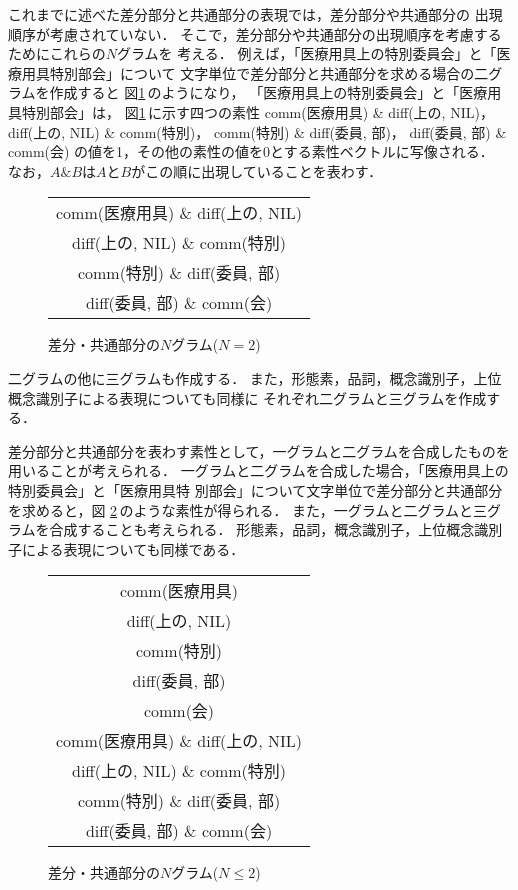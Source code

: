 これまでに述べた差分部分と共通部分の表現では，差分部分や共通部分の
出現順序が考慮されていない．
そこで，差分部分や共通部分の出現順序を考慮するためにこれらの$N$グラムを
考える．
例えば，「医療用具上の特別委員会」と「医療用具特別部会」について
文字単位で差分部分と共通部分を求める場合の二グラムを作成すると
図\ref{fig:mdiff_char_bigram}\,のようになり，
「医療用具上の特別委員会」と「医療用具特別部会」は，
図\ref{fig:mdiff_char_bigram}\,に示す四つの素性
comm(医療用具) \& diff(上の, NIL)，
diff(上の, NIL) \& comm(特別)，
comm(特別) \& diff(委員, 部)，
diff(委員, 部) \& comm(会)
の値を1，その他の素性の値を0とする素性ベクトルに写像される．
なお，$A \& B$は$A$と$B$がこの順に出現していることを表わす．
\begin{figure}[htbp]
\begin{center}
\begin{tabular}{|c|}\hline
comm(医療用具) \& diff(上の, NIL) \\
diff(上の, NIL) \& comm(特別) \\
comm(特別) \& diff(委員, 部) \\
diff(委員, 部) \& comm(会) \\\hline
\end{tabular}
\end{center}
\caption{差分・共通部分の$N$グラム($N = 2$)}
\label{fig:mdiff_char_bigram}
\end{figure}

二グラムの他に三グラムも作成する．
また，形態素，品詞，概念識別子，上位概念識別子による表現についても同様に
それぞれ二グラムと三グラムを作成する．

差分部分と共通部分を表わす素性として，一グラムと二グラムを合成したものを
用いることが考えられる． 
一グラムと二グラムを合成した場合，「医療用具上の特別委員会」と「医療用具特
別部会」について文字単位で差分部分と共通部分を求めると，図
\ref{fig:mdiff_char_bugram}\,のような素性が得られる．
また，一グラムと二グラムと三グラムを合成することも考えられる．
形態素，品詞，概念識別子，上位概念識別子による表現についても同様である．
\begin{figure}[htbp]
\begin{center}
\begin{tabular}{|c|}\hline
comm(医療用具) \\
diff(上の, NIL) \\
comm(特別) \\
diff(委員, 部) \\
comm(会) \\
comm(医療用具) \& diff(上の, NIL) \\
diff(上の, NIL) \& comm(特別) \\
comm(特別) \& diff(委員, 部) \\
diff(委員, 部) \& comm(会) \\\hline
\end{tabular}
\end{center}
\caption{差分・共通部分の$N$グラム($N \le 2$)}
\label{fig:mdiff_char_bugram}
\end{figure}

